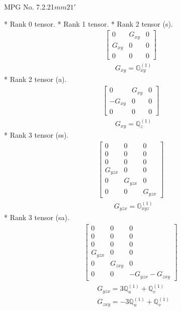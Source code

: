 \documentclass[fleqn,8pt,landscape]{jsarticle}
\begin{document}
\setcounter{MaxMatrixCols}{32}

\renewcommand{\tablename}{Table~}
\renewcommand{\figurename}{Figure~}
\begin{center}
\LARGE
MPG No. 7.2.21\quad$mm21'$
\end{center}
* Rank 0 tensor.
* Rank 1 tensor.
* Rank 2 tensor (s).
\begin{align*}
\begin{bmatrix} 0 & G_{xy} & 0 \\ G_{xy} & 0 & 0 \\ 0 & 0 & 0 \end{bmatrix}
\end{align*}
\begin{align*}
& G_{xy} = \mathbb{G}_{xy}^{(1)}
\end{align*}
* Rank 2 tensor (a).
\begin{align*}
\begin{bmatrix} 0 & G_{xy} & 0 \\ - G_{xy} & 0 & 0 \\ 0 & 0 & 0 \end{bmatrix}
\end{align*}
\begin{align*}
& G_{xy} = \mathbb{Q}_{z}^{(1)}
\end{align*}
* Rank 3 tensor (ss).
\begin{align*}
\begin{bmatrix} 0 & 0 & 0 \\ 0 & 0 & 0 \\ 0 & 0 & 0 \\ G_{yzx} & 0 & 0 \\ 0 & G_{yzx} & 0 \\ 0 & 0 & G_{yzx} \end{bmatrix}
\end{align*}
\begin{align*}
& G_{yzx} = \mathbb{G}_{xyz}^{(1)}
\end{align*}
* Rank 3 tensor (sa).
\begin{align*}
\begin{bmatrix} 0 & 0 & 0 \\ 0 & 0 & 0 \\ 0 & 0 & 0 \\ G_{yzx} & 0 & 0 \\ 0 & G_{zxy} & 0 \\ 0 & 0 & - G_{yzx} - G_{zxy} \end{bmatrix}
\end{align*}
\begin{align*}
& G_{yzx} = 3 \mathbb{Q}_{u}^{(1)} + \mathbb{Q}_{v}^{(1)} \\
& G_{zxy} = - 3 \mathbb{Q}_{u}^{(1)} + \mathbb{Q}_{v}^{(1)}
\end{align*}
\end{document}

